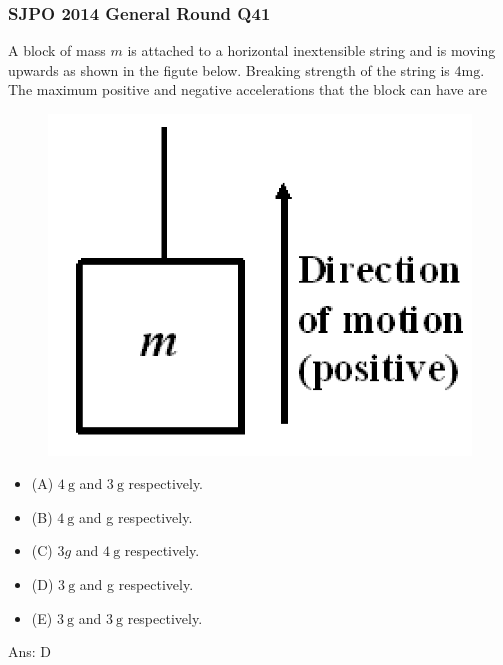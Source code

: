 \documentclass{article}
\begin{document}
\subsubsection{SJPO 2014 General Round Q41}
A block of mass $m$ is attached to a horizontal inextensible string and is moving upwards as shown in the figute below. Breaking strength of the string is $4 \mathrm{mg}$. The maximum positive and negative accelerations that the block can have are
{
\begin{figure}
\includegraphics[width=1.0\linewidth]{images/sjpo2014q41.png}
\end{figure}

\begin{itemize}
\item[] (A) $4 \mathrm{~g}$ and $3 \mathrm{~g}$ respectively.
\item[] (B) $4 \mathrm{~g}$ and g respectively.
\item[] (C) $3 g$ and $4 \mathrm{~g}$ respectively.
\item[] (D) $3 \mathrm{~g}$ and g respectively.
\item[] (E) $3 \mathrm{~g}$ and $3 \mathrm{~g}$ respectively.
\end{itemize}
}
Ans: \ifpaper D \fi
\clearpage
\end{document}
